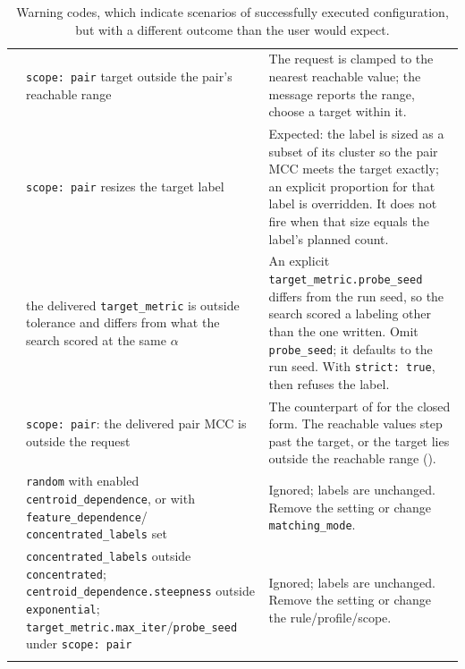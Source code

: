 \documentclass[a4paper,11pt]{article}
\newcommand{\vcode}[1]{\textcolor{valred}{\bfseries\ttfamily #1}}
\newcommand{\wcode}[1]{\textcolor{warnamber}{\bfseries\ttfamily #1}}
\begin{document}
\begin{longtable}{@{}L{1.0cm} L{5.2cm} L{8.8cm}@{}}
\wcode{307} & \texttt{scope: pair} target outside the pair's reachable range & The request is clamped to the nearest reachable value; the message reports the range, choose a target within it. \\
\wcode{308} & \texttt{scope: pair} resizes the target label & Expected: the label is sized as a subset of its cluster so the pair MCC meets the target exactly; an explicit proportion for that label is overridden. It does not fire when that size equals the label's planned count. \\
\wcode{309} & the delivered \texttt{target\_metric} is outside tolerance and differs from what the search scored at the same $\alpha$ & An explicit \texttt{target\_metric.probe\_seed} differs from the run seed, so the search scored a labeling other than the one written. Omit \texttt{probe\_seed}; it defaults to the run seed. With \texttt{strict: true}, \vcode{154} then refuses the label. \\
\wcode{310} & \texttt{scope: pair}: the delivered pair MCC is outside the request & The counterpart of \wcode{306} for the closed form. The reachable values step past the target, or the target lies outside the reachable range (\wcode{307}).\\
\wcode{311} & \texttt{random} with enabled \texttt{centroid\_dependence}, or with \texttt{feature\_dependence}/ \texttt{concentrated\_labels} set & Ignored; labels are unchanged. Remove the setting or change \texttt{matching\_mode}. \\
\wcode{312} & \texttt{concentrated\_labels} outside \texttt{concentrated}; \texttt{centroid\_dependence.steepness} outside \texttt{exponential}; \texttt{target\_metric.max\_iter}/\texttt{probe\_seed} under \texttt{scope: pair} & Ignored; labels are unchanged. Remove the setting or change the rule/profile/scope. \\
\bottomrule
\caption{Warning codes, which indicate scenarios of successfully executed configuration, but with a different outcome than the user would expect.}
\label{warnings}
\end{longtable}

\end{document}
